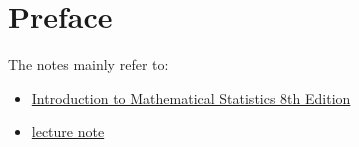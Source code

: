 \chapter*{Preface}

The notes mainly refer to:
\begin{itemize}
    \item \href{}{Introduction to Mathematical Statistics 8th Edition}
    \item \href{https://faculty.etsu.edu/gardnerr/4047/notes-Hogg-McKean-Craig.htm}{lecture note}
\end{itemize}

